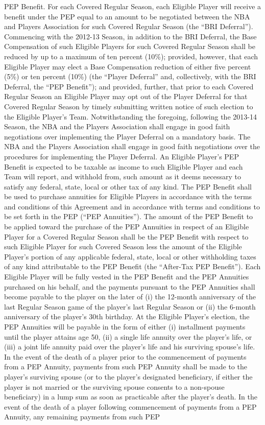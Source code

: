 \documentclass[
]{book}
\begin{document}
\begin{enumerate}
\begin{enumerate}
    PEP Benefit. For each Covered Regular Season, each Eligible Player will receive a benefit under the PEP equal to an amount to be negotiated between the NBA and Players Association for such Covered Regular Season (the ``BRI Deferral''). Commencing with the 2012-13 Season, in addition to the BRI Deferral, the Base Compensation of such Eligible Players for such Covered Regular Season shall be reduced by up to a maximum of ten percent (10\%); provided, however, that each Eligible Player may elect a Base Compensation reduction of either five percent (5\%) or ten percent (10\%) (the ``Player Deferral'' and, collectively, with the BRI Deferral, the ``PEP Benefit''); and provided, further, that prior to each Covered Regular Season an Eligible Player may opt out of the Player Deferral for that Covered Regular Season by timely submitting written notice of such election to the Eligible Player's Team. Notwithstanding the foregoing, following the 2013-14 Season, the NBA and the Players Association shall engage in good faith negotiations over implementing the Player Deferral on a mandatory basis. The NBA and the Players Association shall engage in good faith negotiations over the procedures for implementing the Player Deferral. An Eligible Player's PEP Benefit is expected to be taxable as income to such Eligible Player and each Team will report, and withhold from, such amount as it deems necessary to satisfy any federal, state, local or other tax of any kind. The PEP Benefit shall be used to purchase annuities for Eligible Players in accordance with the terms and conditions of this Agreement and in accordance with terms and conditions to be set forth in the PEP (``PEP Annuities''). The amount of the PEP Benefit to be applied toward the purchase of the PEP Annuities in respect of an Eligible Player for a Covered Regular Season shall be the PEP Benefit with respect to such Eligible Player for such Covered Season less the amount of the Eligible Player's portion of any applicable federal, state, local or other withholding taxes of any kind attributable to the PEP Benefit (the ``After-Tax PEP Benefit''). Each Eligible Player will be fully vested in the PEP Benefit and the PEP Annuities purchased on his behalf, and the payments pursuant to the PEP Annuities shall become payable to the player on the later of (i) the 12-month anniversary of the last Regular Season game of the player's last Regular Season or (ii) the 6-month anniversary of the player's 30th birthday. At the Eligible Player's election, the PEP Annuities will be payable in the form of either (i) installment payments until the player attains age 50, (ii) a single life annuity over the player's life, or (iii) a joint life annuity paid over the player's life and his surviving spouse's life. In the event of the death of a player prior to the commencement of payments from a PEP Annuity, payments from such PEP Annuity shall be made to the player's surviving spouse (or to the player's designated beneficiary, if either the player is not married or the surviving spouse consents to a non-spouse beneficiary) in a lump sum as soon as practicable after the player's death. In the event of the death of a player following commencement of payments from a PEP Annuity, any remaining payments from such PEP 
\end{enumerate}
\end{enumerate}
\end{document}

